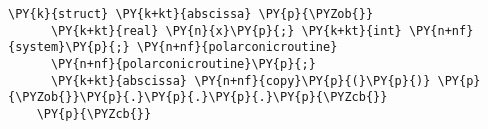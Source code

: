 \begin{Verbatim}[commandchars=\\\{\}]
    \PY{k}{struct} \PY{k+kt}{abscissa} \PY{p}{\PYZob{}}
      \PY{k+kt}{real} \PY{n}{x}\PY{p}{;} \PY{k+kt}{int} \PY{n+nf}{system}\PY{p}{;} \PY{n+nf}{polarconicroutine}
      \PY{n+nf}{polarconicroutine}\PY{p}{;}
      \PY{k+kt}{abscissa} \PY{n+nf}{copy}\PY{p}{(}\PY{p}{)} \PY{p}{\PYZob{}}\PY{p}{.}\PY{p}{.}\PY{p}{.}\PY{p}{\PYZcb{}}
    \PY{p}{\PYZcb{}}
\end{Verbatim}
